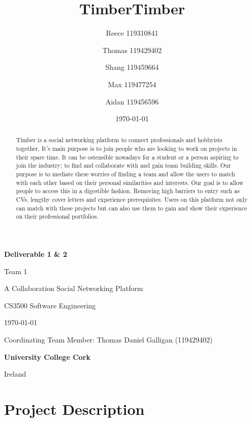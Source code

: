 \documentclass[a4paper,11pt]{report}
\title{Timber}
\author{
    Reece 119310841
    \and
    Thomas 119429402
    \and
    Shang 119459664
    \and
    Max 119477254
    \and
    Aidan 119456596
}
\title{Timber}
\date{\today}
\begin{document}
\begin{titlepage}
    \begin{center}
        \null
        \vfill
        
        \textbf{Deliverable 1 \& 2}
        \vspace{1cm}

        \large Team 1

        \huge{\thetitle}
        \vspace{0.5cm}

        \normalsize A Collaboration Social Networking Platform

        CS3500 Software Engineering
        \vspace{1cm}


        \today
        \vspace{2cm}
        
        Coordinating Team Member: Thomas Daniel Galligan (119429402)
        \vspace {1cm}

        \theauthor
        \vspace{3cm}


        \textbf{University College Cork}
        
        Ireland
        \vfill

    \end{center}
\end{titlepage}

\cleardoublepage

\begin{abstract}
    Timber is a social networking platform to connect professionals and
    hobbyists together. It’s main purpose is to join people who are looking to
    work on projects in their spare time. It can be ostensible nowadays for a
    student or a person aspiring to join the industry; to find and collaborate
    with and gain team building skills. Our purpose is to mediate these worries
    of finding a team and allow the users to match with each other based on
    their personal similarities and interests. Our goal is to allow people to
    access this in a digestible fashion. Removing high barriers to entry such as
    CVs, lengthy cover letters and experience prerequisites. Users on this
    platform not only can match with these projects but can also use them to
    gain and show their experience on their professional portfolios.
\end{abstract}

\tableofcontents

\chapter{Project Description}
\end{document}
